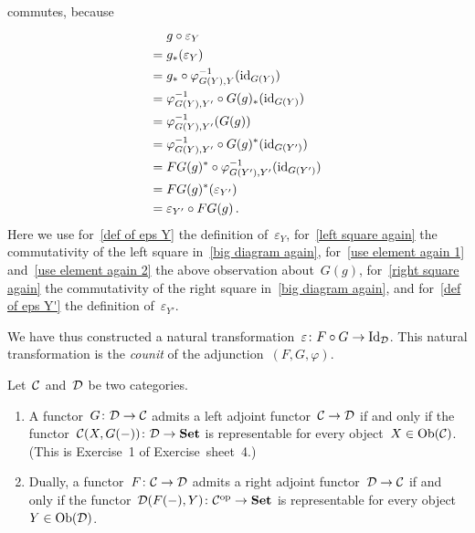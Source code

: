 \begin{remark}[label = triangle equalities]
\begin{enumerate}
\[      \]
      commutes, because
      \begin{align}
         {}&  g \circ \varepsilon_Y  \notag  \\
        ={}&  g_*( \varepsilon_Y )  \notag  \\
        ={}&  g_* \circ \varphi_{G(Y),Y}^{-1}( \operatorname{id}_{G(Y)} ) \label{def of eps Y}  \\
        ={}&  \varphi_{G(Y),Y'}^{-1} \circ G(g)_*( \operatorname{id}_{G(Y)} ) \label{left square again} \\
        ={}&  \varphi_{G(Y),Y'}^{-1}( G(g) )  \label{use element again 1} \\
        ={}&  \varphi_{G(Y),Y'}^{-1} \circ G(g)^*( \operatorname{id}_{G(Y')} )  \label{use element again 2} \\
        ={}&  FG(g)^* \circ \varphi_{G(Y'),Y'}^{-1}( \operatorname{id}_{G(Y')} )  \label{right square again}  \\
        ={}&  FG(g)^*( \varepsilon_{Y'} ) \label{def of eps Y'} \\
        ={}&  \varepsilon_{Y'} \circ FG(g)  \notag  \,.
      \end{align}
      Here we use for~\eqref{def of eps Y} the definition of~$\varepsilon_Y$, for~\eqref{left square again} the commutativity of the left square in~\eqref{big diagram again}, for~\eqref{use element again 1} and~\eqref{use element again 2} the above observation about~$G(g)$, for~\eqref{right square again} the commutativity of the right square in~\eqref{big diagram again}, and for~\eqref{def of eps Y'} the definition of~$\varepsilon_{Y'}$.
      
      We have thus constructed a natural transformation~$\varepsilon \colon F \circ G \to \mathrm{Id}_{\mathcal{D}}$.
      This natural transformation is the \emph{counit} of the adjunction~$(F,G,\varphi)$.
  \end{enumerate}
\end{remark}


\begin{remark*}
  Let~$\mathcal{C}$ and~$\mathcal{D}$ be two categories.
  \begin{enumerate}
    \item
      \label{left adjoint via representing}
      A functor~$G \colon \mathcal{D} \to \mathcal{C}$ admits a left adjoint functor~$\mathcal{C} \to \mathcal{D}$ if and only if the functor~$\mathcal{C}(X,G(-)) \colon \mathcal{D} \to \mathbf{Set}$ is representable for every object~$X \in \operatorname{Ob}(\mathcal{C})$.
      (This is Exercise~1 of Exercise~sheet~4.)
    \item
      Dually, a functor~$F \colon \mathcal{C} \to \mathcal{D}$ admits a right adjoint functor~$\mathcal{D} \to \mathcal{C}$ if and only if the functor~$\mathcal{D}(F(-),Y) \colon \mathcal{C}^{\mathrm{op}} \to \mathbf{Set}$ is representable for every object~$Y \in \operatorname{Ob}(\mathcal{D})$.
  \end{enumerate}
\end{remark*}





